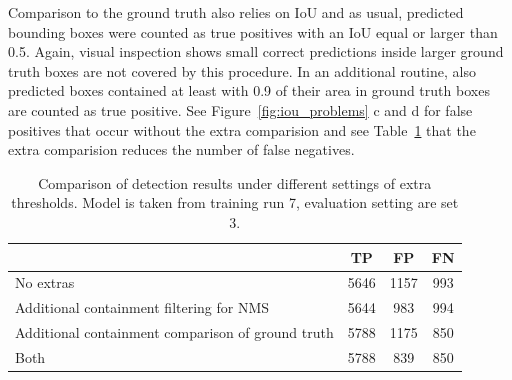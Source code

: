 \documentclass[12pt,a4paper]{article}
\begin{document}
Comparison to the ground truth also relies on IoU and as usual, predicted bounding boxes were counted as true positives with an IoU equal or larger than 0.5. Again, visual inspection shows small correct predictions inside larger ground truth boxes are not covered by this procedure. In an additional routine, also predicted boxes contained at least with 0.9 of their area in ground truth boxes are counted as true positive. See Figure~\ref{fig:iou_problems} c and d for false positives that occur without the extra comparision and see Table~\ref{tab:extra_overlap_filtering} that the extra comparision reduces the number of false negatives.

\begin{table}[h!]
    \centering
    \begin{tabular}{lccc}
        \toprule
        & TP & FP & FN \\
        \midrule
        No extras & 5646  & 1157 &  993 \\
        Additional containment filtering for NMS & 5644  & 983 & 994  \\
        Additional containment comparison of ground truth & 5788 & 1175 & 850   \\
        Both & 5788 & 839  & 850 \\
        \bottomrule
    \end{tabular}
    \caption{Comparison of detection results under different settings of extra thresholds. Model is taken from training run 7, evaluation setting are set 3.}
    \label{tab:extra_overlap_filtering}
\end{table}
\end{document}
